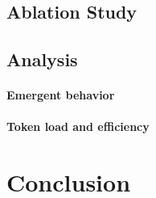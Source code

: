 \documentclass{article} %
\begin{document}
\subsection{Ablation Study}

\subsection{Analysis}

\paragraph{Emergent behavior}

\paragraph{Token load and efficiency}

\section{Conclusion}




\end{document}
